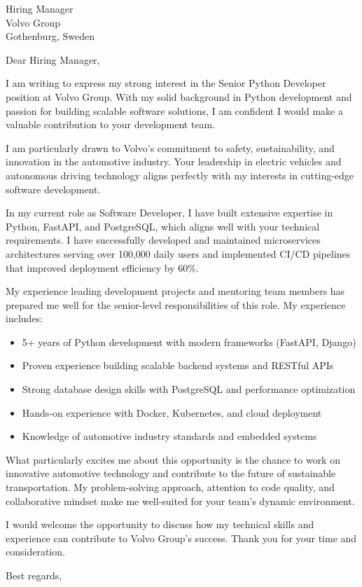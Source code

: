 \documentclass[11pt,a4paper]{letter}
\begin{document}
\begin{letter}{Hiring Manager \\ Volvo Group \\ Gothenburg, Sweden}

\opening{Dear Hiring Manager,}

I am writing to express my strong interest in the Senior Python Developer position at Volvo Group. With my solid background in Python development and passion for building scalable software solutions, I am confident I would make a valuable contribution to your development team.

I am particularly drawn to Volvo's commitment to safety, sustainability, and innovation in the automotive industry. Your leadership in electric vehicles and autonomous driving technology aligns perfectly with my interests in cutting-edge software development.

In my current role as Software Developer, I have built extensive expertise in Python, FastAPI, and PostgreSQL, which aligns well with your technical requirements. I have successfully developed and maintained microservices architectures serving over 100,000 daily users and implemented CI/CD pipelines that improved deployment efficiency by 60\%.

My experience leading development projects and mentoring team members has prepared me well for the senior-level responsibilities of this role. My experience includes:

\begin{itemize}
\item 5+ years of Python development with modern frameworks (FastAPI, Django)
\item Proven experience building scalable backend systems and RESTful APIs
\item Strong database design skills with PostgreSQL and performance optimization
\item Hands-on experience with Docker, Kubernetes, and cloud deployment
\item Knowledge of automotive industry standards and embedded systems
\end{itemize}

What particularly excites me about this opportunity is the chance to work on innovative automotive technology and contribute to the future of sustainable transportation. My problem-solving approach, attention to code quality, and collaborative mindset make me well-suited for your team's dynamic environment.

I would welcome the opportunity to discuss how my technical skills and experience can contribute to Volvo Group's success. Thank you for your time and consideration.

\closing{Best regards,}

\end{letter}
\end{document}
